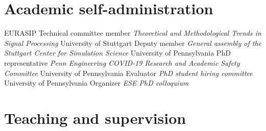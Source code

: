 \documentclass{cvlfoc}
\begin{document}
\begin{entrydate}

\end{entrydate}



\section*{Academic self-administration}

\begin{entrydate}
		{EURASIP}
		{Technical committee member}
		{\textit{Theoretical and Methodological Trends
			in Signal Processing}}
		{University of Stuttgart}
		{Deputy member}
		{\textit{General assembly of the Stuttgart Center for Simulation Science}}
		{University of Pennsylvania}
		{PhD representative}
		{\textit{Penn Engineering COVID-19 Research and Academic Safety Committee}}
		{University of Pennsylvania}
		{Evaluator}
		{\textit{PhD student hiring committee}}
		{University of Pennsylvania}
		{Organizer}
		{\textit{ESE PhD colloquium}}
\end{entrydate}



\section*{Teaching and supervision}
\vspace{0.2\baselineskip}
\end{document}

